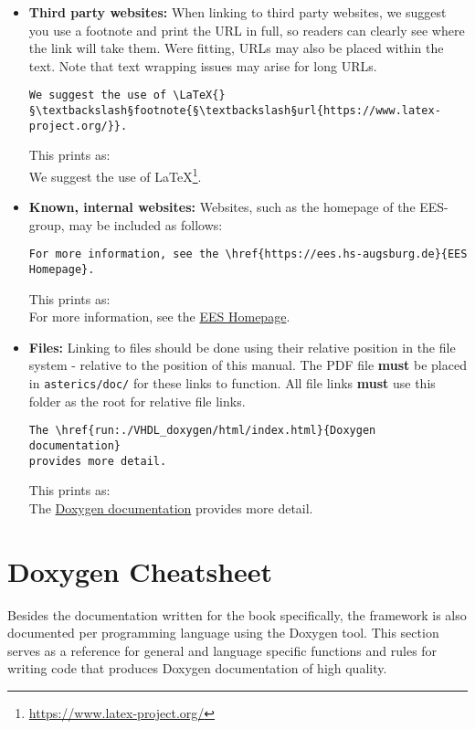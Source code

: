 \begin{itemize}
\item \textbf{Third party websites:} When linking to third party websites, we suggest you use a footnote and print the URL in full, so readers can clearly see where the link will take them. Were fitting, URLs may also be placed within the text. Note that text wrapping issues may arise for long URLs.
\begin{lstlisting}[style=LaTeXStyle]
We suggest the use of \LaTeX{}§\textbackslash§footnote{§\textbackslash§url{https://www.latex-project.org/}}.
\end{lstlisting}
This prints as:\\
We suggest the use of \LaTeX{}\footnote{\url{https://www.latex-project.org/}}.

\item \textbf{Known, internal websites:} Websites, such as the homepage of the EES-group, may be included as follows:
\begin{lstlisting}[style=LaTeXStyle]
For more information, see the \href{https://ees.hs-augsburg.de}{EES Homepage}.
\end{lstlisting}
This prints as:\\
For more information, see the \href{https://ees.hs-augsburg.de}{EES Homepage}.

\item \textbf{Files:} Linking to files should be done using their relative position in the file system - relative to the position of this manual.
The PDF file \textbf{must} be placed in \texttt{asterics/doc/} for these links to function.
All file links \textbf{must} use this folder as the root for relative file links.
\begin{lstlisting}[style=LaTeXStyle]
The \href{run:./VHDL_doxygen/html/index.html}{Doxygen documentation}
provides more detail.
\end{lstlisting}
This prints as:\\
The \href{run:./VHDL_doxygen/html/index.html}{Doxygen documentation}
provides more detail.

\end{itemize}



\clearpage

\section{Doxygen Cheatsheet}

Besides the documentation written for the \asterics book specifically, the framework is also documented per programming language using the Doxygen tool.
This section serves as a reference for general and language specific functions and rules for writing code that produces Doxygen documentation of high quality.

